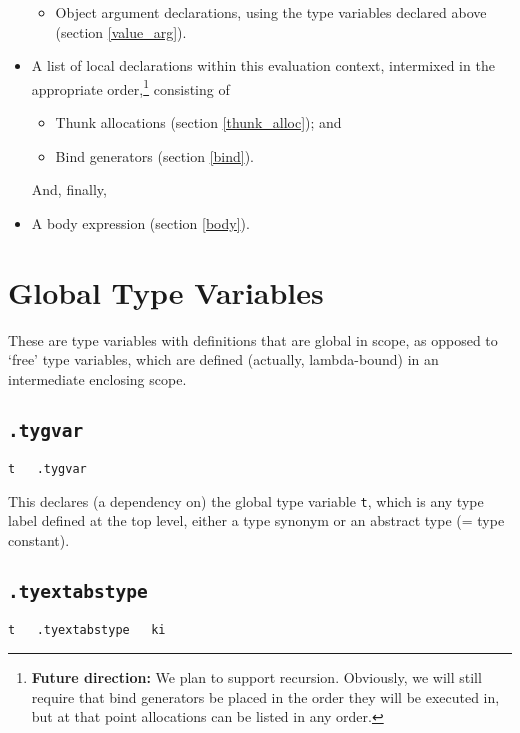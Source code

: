 \documentclass{report}
\newcommand\stringcode[1]{\texttt{#1}}
\newcommand\future[1]{\footnote{\textbf{Future direction:} #1}}
\begin{document}
\begin{itemize}
\begin{itemize}
            \item Object argument declarations, using the type variables declared above (section \ref{value_arg}).
        \end{itemize}
    \item A list of local declarations within this evaluation context,
        intermixed in the appropriate order,\future{We plan to support recursion.
            Obviously, we will still require that bind generators be placed in the order they will be executed in,
            but at that point allocations can be listed in any order.
        }
        consisting of
        \begin{itemize}
            \item Thunk allocations (section \ref{thunk_alloc}); and
            \item Bind generators (section \ref{bind}).
        \end{itemize}
        And, finally,
    \item A body expression (section \ref{body}).
\end{itemize}

\section{Global Type Variables}
\label{code_type_gvar}

These are type variables with definitions that are global in scope,
as opposed to `free' type variables, which are defined (actually, lambda-bound) in an intermediate enclosing scope.

\subsection{\stringcode{.tygvar}}

\begin{verbatim}
t	.tygvar
\end{verbatim}

This declares (a dependency on) the global type variable \stringcode{t},
which is any type label defined at the top level, either a type synonym or an abstract type (= type constant).

\subsection{\stringcode{.tyextabstype}}

\begin{verbatim}
t	.tyextabstype	ki
\end{verbatim}
\end{document}
